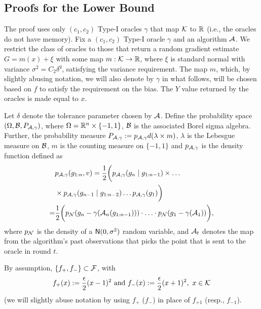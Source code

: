 \subsection{Proofs for the Lower Bound}
\label{sec:lb-proof}

The proof uses only $(c_1,c_2)$ Type-I oracles $\gamma$ that map $\mathcal{K}$ to $\mathbb{R}$ (i.e., the oracles do not have memory).
Fix a  $(c_1,c_2)$ Type-I oracle $\gamma$ and an algorithm $\mathcal{A}$.
We restrict the class of oracles to those that return a random gradient estimate $G = m(x) + \xi$ with some map $m: \mathcal{K} \to \mathbb{R}$,
where $\xi$ is standard normal with variance $\sigma^2 = C_2 \delta^q$, satisfying the variance requirement. 
The map $m$, which, by slightly abusing notation, we will also denote by $\gamma$ in what follows, will be chosen based on $f$ to satisfy the requirement on the bias. The $Y$ value returned by the oracles is made equal to $x$.

Let $\delta$ denote the tolerance parameter chosen by $\mathcal{A}$.
Define the probability space $(\Omega, \mathcal{B}, P_{\mathcal{A},\gamma})$, 
where $\Omega = \mathbb{R}^n\times \{-1,1\}$, $\mathcal{B}$ is the associated Borel sigma algebra. 
Further, the probability measure $P_{\mathcal{A},\gamma} := p_{\mathcal{A},\gamma} d(\lambda \times m)$, 
	$\lambda$ is the Lebesgue measure on $\mathcal{B}$, 
	$m$ is the counting measure on $\{-1,1\}$ and 
	$p_{\mathcal{A},\gamma}$ is the density function defined as
\begin{align*}
&p_{\mathcal{A},\gamma}(g_{1:n}, v) = \dfrac{1}{2} \bigg(p_{\mathcal{A},\gamma}(g_n \mid g_{1:n-1})\times \dots \\
&\times p_{\mathcal{A},\gamma }(g_{n-1} \mid g_{1:n-2}) \ldots p_{\mathcal{A},\gamma}(g_1)\bigg)\\
 = & \dfrac{1}{2} \bigg( p_{\mathcal{N}}(g_n - \gamma(\mathcal{A}_n(g_{1:n-1}))) \cdot
 \ldots \cdot  p_{\mathcal{N}}(g_1 - \gamma(\mathcal{A}_1))\bigg),
\end{align*}
where $p_{\mathcal{N}}$ is the density of a $\mathsf{N}(0,\sigma^2)$ random variable,
and $\mathcal{A}_t$ denotes the map from the algorithm's past observations
that picks the point that is sent to the oracle in round $t$.


By assumption,  $\{f_+, f_-\}\subset \mathcal{F}$, with 
\begin{align*}
  f_+(x) := \dfrac{\epsilon}{2} (x - 1)^2 \text{ and } f_-(x) := \dfrac{\epsilon}{2} (x + 1)^2, \,\, x \in \mathcal{K}
\end{align*}
(we will slightly abuse notation by using $f_+$ ($f_-$) in place of $f_{+1}$ (resp., $f_{-1}$).

